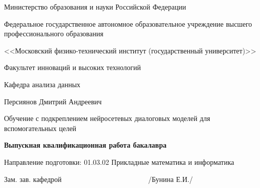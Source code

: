 \documentclass[12pt,a4paper]{amsart}
\begin{document}
{
\begin{titlepage}

\begin{center}
	Министерство образования и науки Российской Федерации
	\vspace{0.4cm}
	
	Федеральное государственное автономное образовательное учреждение высшего профессионального образования
	\vspace{0.4cm}
	
	<<Московский физико-технический институт (государственный университет)>>
	\vspace{0.4cm}
	
	Факультет инноваций и высоких технологий
	\vspace{0.4cm}
	
	Кафедра анализа данных
	\vspace{0.7cm}
	
\end{center}

\vspace{1.4cm}

\begin{center}
	\Large Персиянов Дмитрий Андреевич
\end{center}

\vspace{0.8cm}

\begin{center}
	\Huge Обучение с подкреплением нейросетевых диалоговых моделей \linebreak для вспомогательных целей
\end{center}

\vspace{1.3cm}

\begin{center}
	\bf Выпускная квалификационная работа бакалавра
\end{center}

\vspace{1.8cm}

\begin{center}
	Направление подготовки: 01.03.02 Прикладные математика и информатика
\end{center}

\vspace{0.8cm}

\vspace{2.0cm}

Зам. зав. кафедрой \verb"              " \underline{\quad \quad \quad \quad \quad \quad \quad}
\verb"        "
/Бунина Е.И./


\end{titlepage}}
\end{document}

